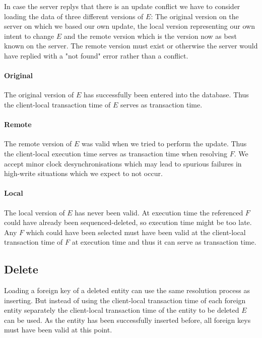 \documentclass{memoir}
\begin{document}
In case the server replys that there is an update conflict we have to consider
loading the data of three different versions of $E$: The original version on the
server on which we based our own update, the local version representing our own
intent to change $E$ and the remote version which is the version now as best
known on the server. The remote version must exist or otherwise the server would
have replied with a "not found" error rather than a conflict.

\paragraph{Original}

The original version of $E$ has successfully been entered into the database.
Thus the client-local transaction time of $E$ serves as transaction time.

\paragraph{Remote}

The remote version of $E$ was valid when we tried to perform the update. Thus
the client-local execution time serves as transaction time when resolving $F$.
We accept minor clock desynchronisations which may lead to spurious failures in
high-write situations which we expect to not occur.

\paragraph{Local}

The local version of $E$ has never been valid. At execution time the referenced
$F$ could have already been sequenced-deleted, so execution time might be too
late. Any $F$ which could have been selected must have been valid at the
client-local transaction time of $F$ at execution time and thus it can serve as
transaction time.

\subsection{Delete}

Loading a foreign key of a deleted entity can use the same resolution process as
inserting. But instead of using the client-local transaction time of each
foreign entity separately the client-local transaction time of the entity to be
deleted $E$ can be used. As the entity has been successfully inserted before,
all foreign keys must have been valid at this point.
\end{document}
